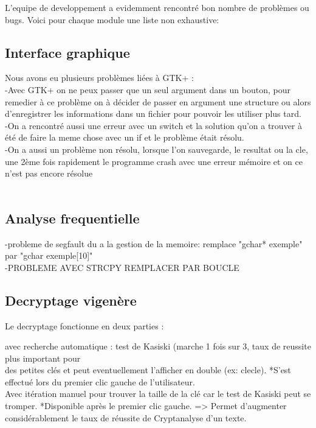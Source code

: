 \documentclass[a4]{article}
\begin{document}
	L'equipe de developpement a evidemment rencontré bon nombre de problèmes ou bugs. Voici pour chaque
	module une liste non exhaustive:
	\subsection{Interface graphique}
	Nous avons eu plusieurs problèmes liées à GTK+ :\\
	-Avec GTK+ on ne peux passer que un seul argument dans un bouton, 
	pour remedier à ce problème on à décider de passer en argument une structure ou alors d'enregistrer les informations dans un fichier pour 
	pouvoir les utiliser plus tard.\\
	-On a rencontré aussi une erreur avec un switch et la solution qu'on a trouver à été de faire 
	la meme chose avec un if et le problème était résolu.\\
	
	-On a aussi un problème non résolu, lorsque l'on sauvegarde, le resultat ou la cle, une 2ème fois rapidement le programme crash 
	avec une erreur mémoire et on ce n'est pas encore résolue\\
	\\
	
	\subsection{Analyse frequentielle}
	-probleme de segfault du a la gestion de la memoire: remplace "gchar* exemple" par "gchar exemple[10]"\\
	-PROBLEME AVEC STRCPY REMPLACER PAR BOUCLE
	\subsection{Decryptage vigenère}
 		Le decryptage fonctionne en deux parties :
 		
 		avec recherche automatique : test de Kasiski (marche 1 fois sur 3, taux de reussite plus important pour \\
 		des petites clés et peut eventuellement l'afficher en double (ex: clecle). 
 		*S'est effectué lors du premier clic gauche de l'utilisateur. \\
 		
 		Avec itération manuel pour trouver la taille de la clé car le test de Kasiski peut se tromper.
 		*Disponible après le premier clic gauche.
 		=> Permet d'augmenter considérablement le taux de réussite de Cryptanalyse d'un texte. \\
  		
\end{document}
